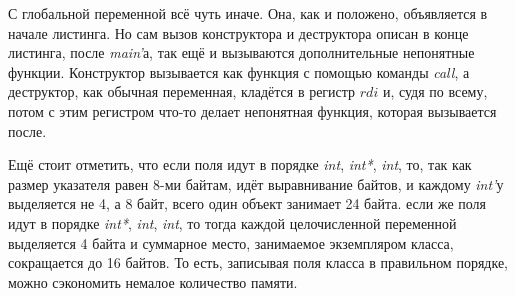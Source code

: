 \documentclass[a4paper,12pt]{article}
\begin{document}
С глобальной переменной всё чуть иначе. Она, как и положено, объявляется в начале листинга. Но сам вызов конструктора и деструктора описан в конце листинга, после \textit{main'}а, так ещё и вызываются дополнительные непонятные функции. Конструктор вызывается как функция с помощью команды \textit{call}, а деструктор, как обычная переменная, кладётся в регистр $rdi$ и, судя по всему, потом с этим регистром что-то делает непонятная функция, которая вызывается после. 
\begin{figure}[H]\label{fig: Глобальный класс листинг}
\end{figure}
Ещё стоит отметить, что если поля идут в порядке \textit{int}, \textit{int*}, \textit{int}, то, так как размер указателя равен 8-ми байтам, идёт выравнивание байтов, и каждому \textit{int'}у выделяется не 4, а 8 байт, всего один объект занимает 24 байта. если же поля идут в порядке \textit{int*}, \textit{int}, \textit{int}, то тогда каждой целочисленной переменной выделяется 4 байта и суммарное место, занимаемое экземпляром класса, сокращается до 16 байтов. То есть, записывая поля класса в правильном порядке, можно сэкономить немалое количество памяти.
\end{document}
